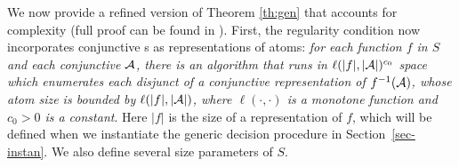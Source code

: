 %


We now provide a refined version of Theorem \ref{th:gen} that accounts for
complexity (full proof can be found in ). First,
the regularity condition \prerec{} now incorporates conjunctive
\FA{}s as representations of atoms: %
\emph{for each function $f$ in $S$ and each conjunctive \FA{} $\mathcal{A}$, 
there is an algorithm that runs in $\ell(|f|,|\mathcal{A}|)^{c_0}$ space which enumerates 
each disjunct of a conjunctive representation of $f^{-1}(\mathcal{A})$, whose atom size is bounded by $\ell(|f|,|\mathcal{A}|)$, where $\ell(\cdot, \cdot)$ is a monotone function and $c_0 > 0$ is a constant}.
%
%
Here $|f|$ is the size of a representation of $f$, which will be defined
when we
%
instantiate the generic decision procedure in Section~\ref{sec-instan}.
We also define several size parameters of $S$.
